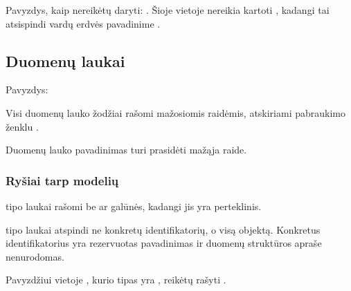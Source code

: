 \documentclass[letterpaper,10pt,lithuanian]{sphinxmanual}
\begin{document}
\sphinxAtStartPar
Pavyzdys, kaip nereikėtų daryti: . Šioje
vietoje nereikia kartoti , kadangi tai atsispindi vardų erdvės
pavadinime .


\subsection{Duomenų laukai}
\label{\detokenize{pavadinimai:duomenu-laukai}}
\sphinxAtStartPar
Pavyzdys: 

\sphinxAtStartPar
Visi duomenų lauko žodžiai rašomi mažosiomis raidėmis, atskiriami pabraukimo
ženklu \sphinxcode{\sphinxupquote{\_}}.

\sphinxAtStartPar
Duomenų lauko pavadinimas turi prasidėti mažąja raide.


\subsubsection{Ryšiai tarp modelių}
\label{\detokenize{pavadinimai:rysiai-tarp-modeliu}}
\sphinxAtStartPar
{\hyperref[\detokenize{formatas:ref}]{}} tipo laukai rašomi be  ar  galūnės, kadangi jis yra
perteklinis.

\sphinxAtStartPar
{\hyperref[\detokenize{formatas:ref}]{}} tipo laukai atspindi ne konkretų identifikatorių, o visą
objektą. Konkretus identifikatorius yra rezervuotas pavadinimas ir
duomenų struktūros apraše nenurodomas.

\sphinxAtStartPar
Pavyzdžiui vietoje , kurio tipas yra , reikėtų rašyti
.
\end{document}

